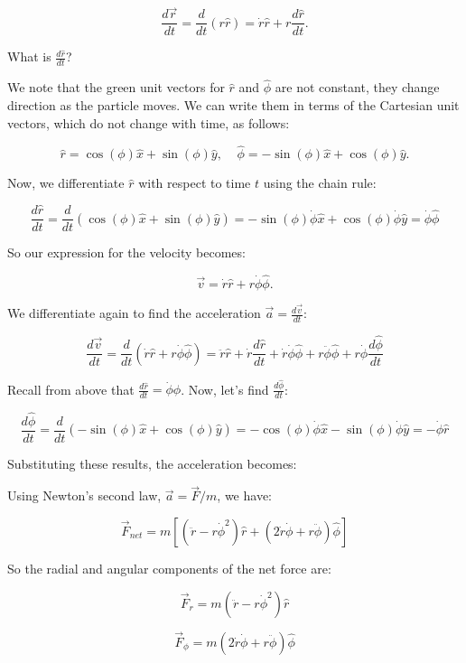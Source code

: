 \documentclass[11pt]{article}
\begin{document}
\[
\dfrac{d\vec{r}}{dt} = \frac{d}{dt}(r \hat{r}) = \dot{r} \hat{r} + r \frac{d\hat{r}}{dt}.
\]

What is \(\frac{d\hat{r}}{dt}\)?

We note that the green unit vectors for \(\hat{r}\) and \(\hat{\phi}\)
are not constant, they change direction as the particle moves. We can
write them in terms of the Cartesian unit vectors, which do not change
with time, as follows:

\[
\hat{r} = \cos(\phi) \hat{x} + \sin(\phi) \hat{y}, \;\;\;\; \hat{\phi} = -\sin(\phi) \hat{x} + \cos(\phi) \hat{y}.
\]

Now, we differentiate \(\hat{r}\) with respect to time \(t\) using the
chain rule:

\[
\frac{d\hat{r}}{dt} = \frac{d}{dt}(\cos(\phi) \hat{x} + \sin(\phi) \hat{y}) = -\sin(\phi) \dot{\phi} \hat{x} + \cos(\phi) \dot{\phi} \hat{y} = \dot{\phi} \hat{\phi}
\]

So our expression for the velocity becomes:

\[
\vec{v} = \dot{r} \hat{r} + r \dot{\phi} \hat{\phi}.
\]

We differentiate again to find the acceleration
\(\vec{a} = \frac{d\vec{v}}{dt}\):

\[
\frac{d\vec{v}}{dt} = \frac{d}{dt}(\dot{r} \hat{r} + r \dot{\phi} \hat{\phi}) = \ddot{r} \hat{r} + \dot{r} \frac{d\hat{r}}{dt} + \dot{r} \dot{\phi} \hat{\phi} + r \ddot{\phi} \hat{\phi} + r \dot{\phi} \frac{d\hat{\phi}}{dt}
\]

Recall from above that \(\frac{d\hat{r}}{dt} = \dot{\phi} \hat{\phi}\).
Now, let's find \(\frac{d\hat{\phi}}{dt}\):

\[
\frac{d\hat{\phi}}{dt} = \frac{d}{dt}(-\sin(\phi) \hat{x} + \cos(\phi) \hat{y}) = -\cos(\phi) \dot{\phi} \hat{x} - \sin(\phi) \dot{\phi} \hat{y} = -\dot{\phi} \hat{r}
\]

Substituting these results, the acceleration becomes:

Using Newton's second law, \(\vec{a} = \vec{F}/m\), we have:

\[
\vec{F}_{net} = m\left[(\ddot{r} - r \dot{\phi}^2) \hat{r} + (2 \dot{r} \dot{\phi} + r \ddot{\phi}) \hat{\phi}\right]
\]

So the radial and angular components of the net force are:

\[
\vec{F}_{r} = m(\ddot{r} - r \dot{\phi}^2) \hat{r}
\]

\[
\vec{F}_{\phi} = m(2 \dot{r} \dot{\phi} + r \ddot{\phi}) \hat{\phi}
\]
\end{document}
